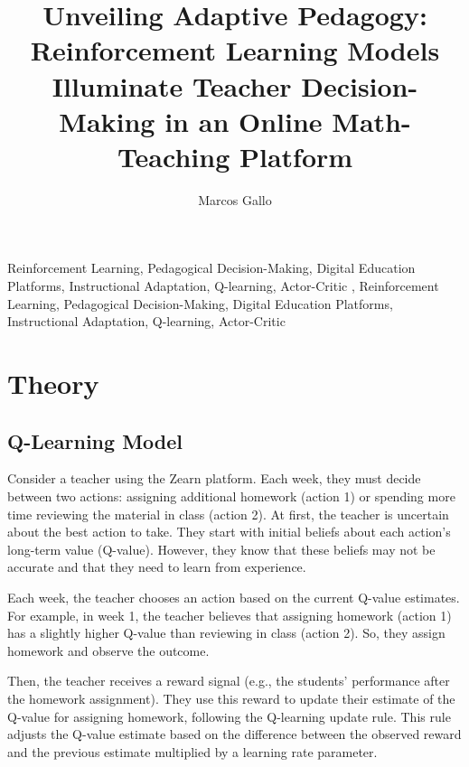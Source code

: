 \documentclass[
  number,
  preprint,
  3p,
  onecolumn]{elsarticle}
\begin{document}
\begin{frontmatter}
\title{Unveiling Adaptive Pedagogy: Reinforcement Learning Models
Illuminate Teacher Decision-Making in an Online Math-Teaching Platform}
\author[]{Marcos Gallo%
%
}




        





\begin{keyword}
    Reinforcement Learning, Pedagogical Decision-Making, Digital
Education Platforms, Instructional Adaptation, Q-learning,
Actor-Critic \sep 
    Reinforcement Learning, Pedagogical Decision-Making, Digital
Education Platforms, Instructional Adaptation, Q-learning, Actor-Critic
\end{keyword}
\end{frontmatter}
    

\section{Theory}\label{theory}

\subsection{Q-Learning Model}\label{q-learning-model}

Consider a teacher using the Zearn platform. Each week, they must decide
between two actions: assigning additional homework (action 1) or
spending more time reviewing the material in class (action 2). At first,
the teacher is uncertain about the best action to take. They start with
initial beliefs about each action's long-term value (Q-value). However,
they know that these beliefs may not be accurate and that they need to
learn from experience.

Each week, the teacher chooses an action based on the current Q-value
estimates. For example, in week 1, the teacher believes that assigning
homework (action 1) has a slightly higher Q-value than reviewing in
class (action 2). So, they assign homework and observe the outcome.

Then, the teacher receives a reward signal (e.g., the students'
performance after the homework assignment). They use this reward to
update their estimate of the Q-value for assigning homework, following
the Q-learning update rule. This rule adjusts the Q-value estimate based
on the difference between the observed reward and the previous estimate
multiplied by a learning rate parameter.
\end{document}
